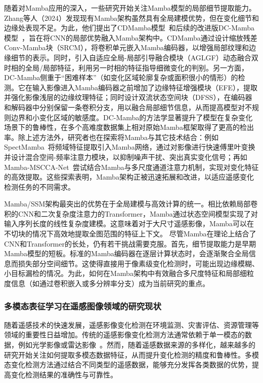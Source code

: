 随着对Mamba应用的深入，一些研究开始关注Mamba模型的局部细节提取能力。Zhang等人（2024）发现现有Mamba架构虽然具有全局建模优势，但在变化细节和边缘处表现不足。为此，他们提出了CDMamba模型~\cite{zhang_cdmamba_2025}和后续的改进版DC-Mamba模型~\cite{Zhang2024DCMambaAN}，旨在将CNN的局部优势融入Mamba架构中。CDMamba通过设计缩放残差Conv-Mamba块（SRCM），将卷积单元嵌入Mamba编码器，以增强局部纹理和边缘细节的表示。同时，引入自适应全局-局部引导融合模块（AGLGF）动态融合双时相的全局/局部特征，利用另一时相的特征指导细微变化的判别。另一方面，DC-Mamba侧重于“困难样本”（如变化区域轮廓复杂或面积很小的情形）的检测。它在输入影像进入Mamba编码器之前增加了边缘特征增强模块（EFE），提取并强化影像浅层的边缘纹理特征；同时设计双流状态空间块（DFSS），在编码器和解码器中分别保留一条卷积分支，用以融合局部细节信息，从而提高模型对不规则边界和小变化区域的敏感度。DC-Mamba的方法学显著提升了模型在复杂变化场景下的鲁棒性，在多个高难度数据集上相对原始Mamba框架取得了更高的检出率。除上述方法外，研究者也在探索将Mamba与其它技术结合：例如SpectMamba~\cite{Dong2025SpectMambaRS}将频域特征提取引入Mamba网络，通过对影像进行快速傅里叶变换并设计混合空间-频率注意力模块，以抑制噪声干扰、突出真实变化信号；再如Mamba-MSCCA-Net~\cite{Song_Displays_2025_p103097}尝试结合Mamba与多尺度通道注意力机制，实现对变化特征的高效提取。这些探索表明，Mamba架构正被迅速拓展和改进，以适应遥感变化检测任务的不同需求。

Mamba/SSM架构最突出的优势在于全局建模与高效计算的统一。相比依赖局部卷积的CNN和二次复杂度注意力的Transformer，Mamba通过状态空间模型实现了对输入序列长度的线性复杂度建模。这意味着对于大尺寸遥感影像，Mamba可以在不切块的情况下高效地提取全图范围的特征上下文。 尽管Mamba在理论上结合了CNN和Transformer的长处，仍有若干挑战需要克服。首先，细节提取能力是早期Mamba模型的短板。标准的Mamba编码器在逐层计算状态时，会逐渐聚合全局信息而损失部分空间细节。这使得直接用于像素级变化检测时，可能出现边缘模糊、小目标漏检的情况。为此，如何在Mamba架构中有效融合多尺度特征和局部细粒度信息（如通过卷积嵌入或多分辨率分支）成为当前研究的重点。

\subsubsection{多模态表征学习在遥感图像领域的研究现状}

随着遥感技术的快速发展，遥感影像变化检测在环境监测、灾害评估、资源管理等领域的重要性日益增加。传统的遥感影像变化检测方法通常依赖于单一模态的数据，例如光学影像或雷达影像~\cite{Zhang2023MultimodalAC}。然而，随着遥感数据来源的多样化，越来越多的研究开始关注如何提取多模态数据特征，从而提升变化检测的精度和鲁棒性。多模态变化检测方法通过结合不同类型的遥感数据，能够充分发挥各类数据的优势，提高变化检测结果的准确性与可靠性。

